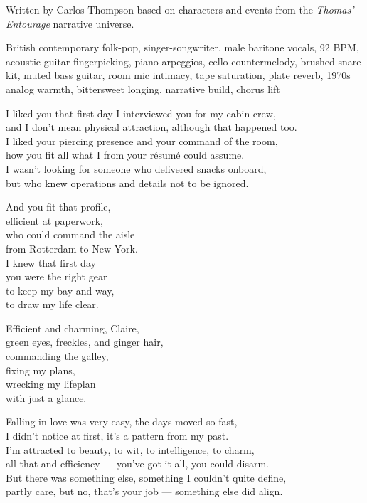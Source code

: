 
\begin{notes}
Written by Carlos Thompson based on characters and events from the \emph{Thomas’ Entourage} narrative universe.
\end{notes}
\begin{style}
British contemporary folk-pop, singer-songwriter, male baritone vocals, 92 BPM, acoustic guitar fingerpicking, piano arpeggios, cello countermelody, brushed snare kit, muted bass guitar, room mic intimacy, tape saturation, plate reverb, 1970s analog warmth, bittersweet longing, narrative build, chorus lift
\end{style}
\begin{lyrics}
I liked you that first day I interviewed you for my cabin crew,\\
and I don't mean physical attraction, although that happened too.\\
I liked your piercing presence and your command of the room,\\
how you fit all what I from your résumé could assume.\\
I wasn't looking for someone who delivered snacks onboard,\\
but who knew operations and details not to be ignored.

And you fit that profile,\\
efficient at paperwork,\\
who could command the aisle\\
from Rotterdam to New York.\\
I knew that first day\\
you were the right gear\\
to keep my bay and way,\\
to draw my life clear.

Efficient and charming, Claire,\\
green eyes, freckles, and ginger hair,\\
commanding the galley,\\
fixing my plans,\\
wrecking my lifeplan\\
with just a glance.

Falling in love was very easy, the days moved so fast,\\
I didn't notice at first, it's a pattern from my past.\\
I'm attracted to beauty, to wit, to intelligence, to charm,\\
all that and efficiency — you've got it all, you could disarm.\\
But there was something else, something I couldn't quite define,\\
partly care, but no, that's your job — something else did align.


\end{lyrics}
